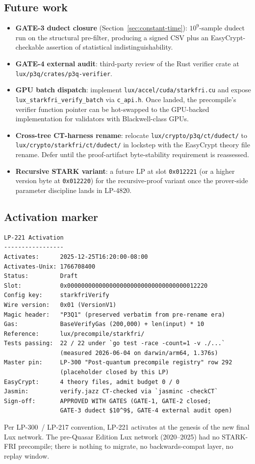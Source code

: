 \subsection{Future work}

\begin{itemize}[leftmargin=2em,nosep]
\item \textbf{GATE-3 dudect closure} (Section~\ref{sec:constant-time}):
  $10^9$-sample dudect run on the structural pre-filter,
  producing a signed CSV plus an EasyCrypt-checkable assertion of
  statistical indistinguishability.
\item \textbf{GATE-4 external audit}: third-party review of the
  Rust verifier crate at \texttt{lux/p3q/crates/p3q-verifier}.
\item \textbf{GPU batch dispatch}: implement
  \texttt{lux/accel/cuda/starkfri.cu} and expose
  \texttt{lux\_starkfri\_verify\_batch} via \texttt{c\_api.h}.
  Once landed, the precompile's verifier function pointer can be
  hot-swapped to the GPU-backed implementation for validators
  with Blackwell-class GPUs.
\item \textbf{Cross-tree CT-harness rename}: relocate
  \texttt{lux/crypto/p3q/ct/dudect/} to
  \texttt{lux/crypto/starkfri/ct/dudect/} in lockstep with the
  EasyCrypt theory file rename. Defer until the proof-artifact
  byte-stability requirement is reassessed.
\item \textbf{Recursive STARK variant}: a future LP at slot
  \texttt{0x012221} (or a higher version byte at \texttt{0x012220})
  for the recursive-proof variant once the prover-side parameter
  discipline lands in LP-4820.
\end{itemize}

\subsection{Activation marker}

\begin{verbatim}
LP-221 Activation
-----------------
Activates:      2025-12-25T16:20:00-08:00
Activates-Unix: 1766708400
Status:         Draft
Slot:           0x0000000000000000000000000000000000012220
Config key:     starkfriVerify
Wire version:   0x01 (VersionV1)
Magic header:   "P3Q1" (preserved verbatim from pre-rename era)
Gas:            BaseVerifyGas (200,000) + len(input) * 10
Reference:      lux/precompile/starkfri/
Tests passing:  22 / 22 under `go test -race -count=1 -v ./...`
                (measured 2026-06-04 on darwin/arm64, 1.376s)
Master pin:     LP-300 "Post-quantum precompile registry" row 292
                (placeholder closed by this LP)
EasyCrypt:      4 theory files, admit budget 0 / 0
Jasmin:         verify.jazz CT-checked via `jasminc -checkCT`
Sign-off:       APPROVED WITH GATES (GATE-1, GATE-2 closed;
                GATE-3 dudect $10^9$, GATE-4 external audit open)
\end{verbatim}

Per LP-300~/ LP-217 convention, LP-221 activates at the genesis of
the new final Lux network. The pre-Quasar Edition Lux network
(2020--2025) had no STARK-FRI precompile; there is nothing to
migrate, no backwards-compat layer, no replay window.
